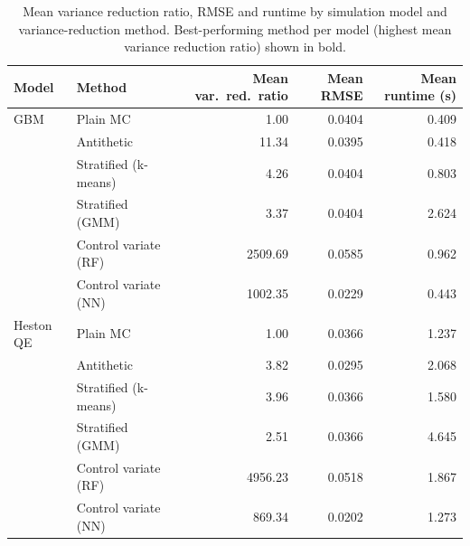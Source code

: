 \begin{table}[ht]
\centering
\caption{Mean variance reduction ratio, RMSE and runtime by simulation model and variance-reduction method. Best-performing method per model (highest mean variance reduction ratio) shown in bold.}
\label{tab:by_model}
\begin{tabular}{llrrr}
\toprule
Model & Method & Mean var.\ red.\ ratio & Mean RMSE & Mean runtime (s) \\
\midrule
GBM & Plain MC & 1.00 & 0.0404 & 0.409 \\
 & Antithetic & 11.34 & 0.0395 & 0.418 \\
 & Stratified (k-means) & 4.26 & 0.0404 & 0.803 \\
 & Stratified (GMM) & 3.37 & 0.0404 & 2.624 \\
 & Control variate (RF) & 2509.69 & 0.0585 & 0.962 \\
 & Control variate (NN) & 1002.35 & 0.0229 & 0.443 \\
\addlinespace
Heston QE & Plain MC & 1.00 & 0.0366 & 1.237 \\
 & Antithetic & 3.82 & 0.0295 & 2.068 \\
 & Stratified (k-means) & 3.96 & 0.0366 & 1.580 \\
 & Stratified (GMM) & 2.51 & 0.0366 & 4.645 \\
 & Control variate (RF) & 4956.23 & 0.0518 & 1.867 \\
 & Control variate (NN) & 869.34 & 0.0202 & 1.273 \\
\bottomrule
\end{tabular}
\end{table}
